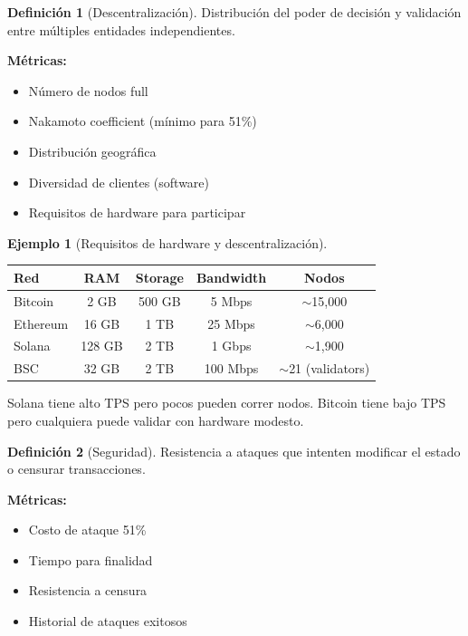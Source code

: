 \documentclass[11pt,a4paper,twoside,openright]{book}
\theoremstyle{definition}
\newtheorem{definition}{Definición}[chapter]
\newtheorem{example}{Ejemplo}[chapter]
\theoremstyle{plain}
\theoremstyle{remark}
\begin{document}
\begin{definition}[Descentralización]
Distribución del poder de decisión y validación entre múltiples entidades independientes.

\textbf{Métricas:}
\begin{itemize}
    \item Número de nodos full
    \item Nakamoto coefficient (mínimo para 51\%)
    \item Distribución geográfica
    \item Diversidad de clientes (software)
    \item Requisitos de hardware para participar
\end{itemize}
\end{definition}

\begin{example}[Requisitos de hardware y descentralización]
\begin{center}
\begin{tabular}{lcccc}
\toprule
\textbf{Red} & \textbf{RAM} & \textbf{Storage} & \textbf{Bandwidth} & \textbf{Nodos} \\
\midrule
Bitcoin & 2 GB & 500 GB & 5 Mbps & $\sim$15,000 \\
Ethereum & 16 GB & 1 TB & 25 Mbps & $\sim$6,000 \\
Solana & 128 GB & 2 TB & 1 Gbps & $\sim$1,900 \\
BSC & 32 GB & 2 TB & 100 Mbps & $\sim$21 (validators) \\
\bottomrule
\end{tabular}
\end{center}

Solana tiene alto TPS pero pocos pueden correr nodos. Bitcoin tiene bajo TPS pero cualquiera puede validar con hardware modesto.
\end{example}

\begin{definition}[Seguridad]
Resistencia a ataques que intenten modificar el estado o censurar transacciones.

\textbf{Métricas:}
\begin{itemize}
    \item Costo de ataque 51\%
    \item Tiempo para finalidad
    \item Resistencia a censura
    \item Historial de ataques exitosos
\end{itemize}
\end{definition}
\end{document}
